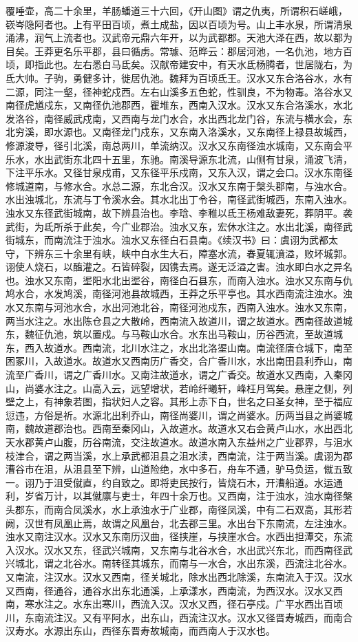 \documentclass[12pt,UTF8]{ctexbook}
\begin{document}
覆唾壶，高二十余里，羊肠蟠道三十六回，《开山图》谓之仇夷，所谓积石嵯峨，嵚岑隐阿者也。上有平田百顷，煮土成盐，因以百顷为号。山上丰水泉，所谓清泉涌沸，润气上流者也。汉武帝元鼎六年开，以为武都郡。天池大泽在西，故以都为目矣。王莽更名乐平郡，县曰循虏。常璩、范晔云：郡居河池，一名仇池，地方百顷，即指此也。左右悉白马氐矣。汉献帝建安中，有天水氐杨腾者，世居陇右，为氐大帅。子驹，勇健多计，徙居仇池。魏拜为百顷氐王。汉水又东合洛谷水，水有二源，同注一壑，径神蛇戍西。左右山溪多五色蛇，性驯良，不为物毒。洛谷水又南径虎馗戍东，又南径仇池郡西，瞿堆东，西南入汉水。汉水又东合洛溪水，水北发洛谷，南径威武戍南，又西南与龙门水合，水出西北龙门谷，东流与横水会，东北穷溪，即水源也。又南径龙门戍东，又东南入洛溪水，又东南径上禄县故城西，修源浚导，径引北溪，南总两川，单流纳汉。汉水又东南径浊水城南，又东南会平乐水，水出武街东北四十五里，东驰。南溪导源东北流，山侧有甘泉，涌波飞清，下注平乐水。又径甘泉戍甫，又东径平乐戍南，又东入汉，谓之会口。汉水东南径修城道南，与修水合。水总二源，东北合汉。汉水又东南于槃头郡南，与浊水合。水出浊城北，东流与丁令溪水会。其水北出丁令谷，南径武街城西，东南入浊水。浊水又东径武街城南，故下辨县治也。李琀、李稚以氐王杨难敌妻死，葬阴平。袭武街，为氐所杀于此矣，今广业郡治。浊水又东，宏休水注之。水出北溪，南径武街城东，而南流注于浊水。浊水又东径白石县南。《续汉书》曰：虞诩为武都太守，下辨东三十余里有峡，峡中白水生大石，障塞水流，春夏辄濆溢，败坏城郭。诩使人烧石，以醢灌之。石皆碎裂，因镌去焉。遂无泛溢之害。浊水即白水之异名也。浊水又东南，埿阳水北出埿谷，南径白石县东，而南入浊水。浊水又东南与仇鸠水合，水发鸠溪，南径河池县故城西，王莽之乐平亭也。其水西南流注浊水。浊水又东南与河池水合，水出河池北谷，南径河池戍东，西南入浊水。浊水又东南，两当水注之。水出陈仓县之大散岭，西南流入故道川，谓之故道水。西南径故道城东，魏征仇池，筑以置戍。与马鞍山水合。水东出马鞍山，历谷西流，至故道城东，西入故道水。西南流，北川水注之，水出北洛埿山南。南流径唐仓城下，南至困冢川，入故道水。故道水又西南历广香交，合广香川水，水出南田县利乔山，南流至广香川，谓之广香川水。又南注故道水，谓之广香交。故道水又西南，入秦冈山，尚婆水注之。山高入云，远望增状，若岭纤曦轩，峰枉月驾矣。悬崖之侧，列壁之上，有神象若图，指状妇人之容。其形上赤下白，世名之曰圣女神，至于福应愆违，方俗是祈。水源北出利乔山，南径尚婆川，谓之尚婆水。历两当县之尚婆城南，魏故道郡治也。西南至秦冈山，入故道水。故道水又右会黄卢山水，水出西北天水郡黄卢山腹，历谷南流，交注故道水。故道水南入东益州之广业郡界，与沮水枝津合，谓之两当溪，水上承武都沮县之沮水渎，西南流，注于两当溪。虞诩为郡漕谷市在沮，从沮县至下辨，山道险绝，水中多石，舟车不通，驴马负运，僦五致一。诩乃于沮受僦直，约自致之。即将吏民按行，皆烧石木，开漕船道。水运通利，岁省万计，以其僦廪与吏士，年四十余万也。又西南，注于浊水，浊水南径槃头郡东，而南合凤溪水，水上承浊水于广业郡，南径凤溪，中有二石双高，其形若阙，汉世有凤凰止焉，故谓之风凰台，北去郡三里。水出台下东南流，左注浊水。浊水又南注汉水。汉水又东南历汉曲，径挟崖，与挟崖水合。水西出担潭交，东流入汉水。汉水又东，径武兴城南，又东南与北谷水合，水出武兴东北，而西南径武兴城北，谓之北谷水。南转径其城东，而南与一水合，水出东溪，西流注北谷水。又南流，注汉水。汉水又西南，径关城北，除水出西北除溪，东南流入于汉。汉水又西南，径通谷，通谷水出东北通溪，上承漾水，西南流，为西汉水。汉水又西南，寒水注之。水东出寒川，西流入汉。汉水又西，径石亭戍。广平水西出百顷川，东南流注汉。又有平阿水，出东山，西流注汉水。汉水又径晋寿城西，而南合汉寿水。水源出东山，西径东晋寿故城南，而西南人于汉水也。
\end{document}
